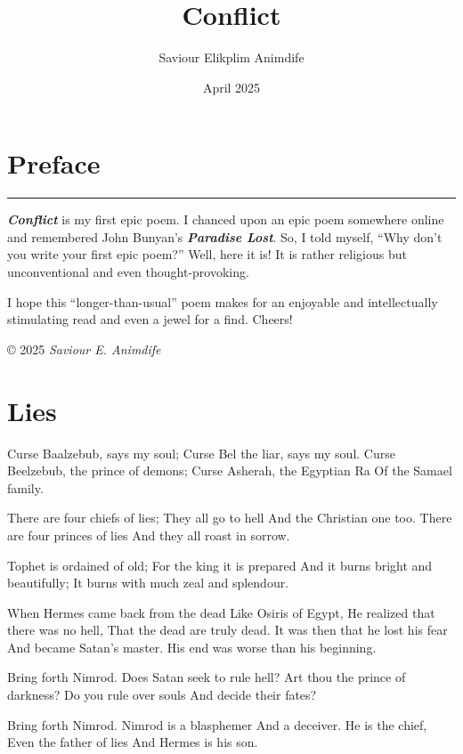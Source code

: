 \documentclass[
]{book}
\title{Conflict}
\author{Saviour Elikplim Animdife}
\date{April 2025}
\begin{document}
\maketitle

{
\setcounter{tocdepth}{1}
\tableofcontents
}
\chapter*{Preface}\label{preface}

\begin{center}\rule{0.5\linewidth}{0.5pt}\end{center}

\textbf{\emph{Conflict}} is my first epic poem. I chanced upon an epic poem somewhere online and remembered John Bunyan's \textbf{\emph{Paradise Lost}}. So, I told myself, ``Why don't you write your first epic poem?'' Well, here it is! It is rather religious but unconventional and even thought-provoking.

I hope this ``longer-than-usual'' poem makes for an enjoyable and intellectually stimulating read and even a jewel for a find. Cheers!

© 2025 \emph{Saviour E. Animdife}

\chapter{Lies}\label{lies}

Curse Baalzebub, says my soul;
Curse Bel the liar, says my soul.
Curse Beelzebub, the prince of demons;
Curse Asherah, the Egyptian Ra
Of the Samael family.

There are four chiefs of lies;
They all go to hell
And the Christian one too.
There are four princes of lies
And they all roast in sorrow.

Tophet is ordained of old;
For the king it is prepared
And it burns bright and beautifully;
It burns with much zeal and splendour.

When Hermes came back from the dead
Like Osiris of Egypt,
He realized that there was no hell,
That the dead are truly dead.
It was then that he lost his fear
And became Satan's master.
His end was worse than his beginning.

Bring forth Nimrod.
Does Satan seek to rule hell?
Art thou the prince of darkness?
Do you rule over souls
And decide their fates?

Bring forth Nimrod.
Nimrod is a blasphemer
And a deceiver.
He is the chief,
Even the father of lies
And Hermes is his son.
\end{document}
